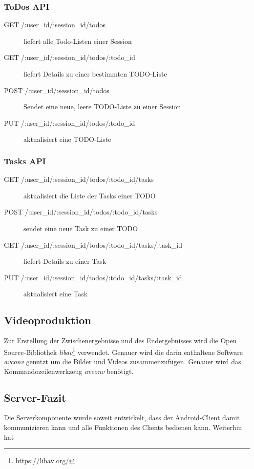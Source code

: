 \subsubsection{ToDos API}

\begin{description}

	\item[GET /:user\_id/:session\_id/todos] liefert alle Todo-Listen einer Session	
	\item[GET /:user\_id/:session\_id/todos/:todo\_id] liefert Details zu einer bestimmten TODO-Liste	
	\item[POST /:user\_id/:session\_id/todos] Sendet eine neue, leere TODO-Liste zu einer Session
	
	\item[PUT /:user\_id/:session\_id/todos/:todo\_id] aktualisiert eine TODO-Liste
	
\end{description}

\subsubsection{Tasks API}

\begin{description}

	\item[GET /:user\_id/:session\_id/todos/:todo\_id/tasks] aktualisiert die Liste der Tasks einer TODO	
	\item[POST /:user\_id/:session\_id/todos/:todo\_id/tasks] sendet eine neue Task zu einer TODO
	
	\item[GET /:user\_id/:session\_id/todos/:todo\_id/tasks/:task\_id] liefert Details zu einer Task
	
	\item[PUT /:user\_id/:session\_id/todos/:todo\_id/tasks/:task\_id] aktualisiert eine Task
	  
\end{description}


\subsection{Videoproduktion}

Zur Erstellung der Zwischenergebnisse und des Endergebnisses wird die Open Source-Bibliothek \emph{libav}\footnote{https://libav.org/} verwendet. Genauer wird die darin enthaltene Software \emph{avconv} genutzt um die Bilder und Videos zusammenzufügen. Genauer wird das Kommandozeilenwerkzeug \textit{avconv} benötigt.

\subsection{Server-Fazit}

Die Serverkomponente wurde soweit entwickelt, dass der Android-Client damit kommunizieren kann und alle Funktionen des Clients bedienen kann. Weiterhin hat 
